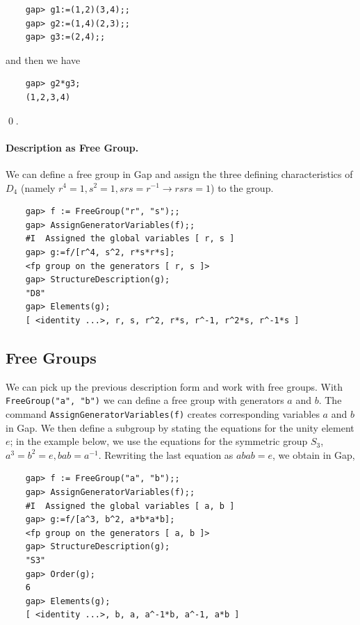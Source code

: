 \begin{verbatim}
    gap> g1:=(1,2)(3,4);;
    gap> g2:=(1,4)(2,3);;
    gap> g3:=(2,4);;
\end{verbatim}

and then we have

\begin{verbatim}
    gap> g2*g3;
    (1,2,3,4)
\end{verbatim}

\qed.

\paragraph{Description as Free Group.} We can define a free group in Gap and assign the three defining characteristics of $D_4$ (namely $r^4 = 1, s^2 = 1, srs = r^{-1} \rightarrow rsrs = 1$) to the group.

\begin{verbatim}
    gap> f := FreeGroup("r", "s");;
    gap> AssignGeneratorVariables(f);;
    #I  Assigned the global variables [ r, s ]
    gap> g:=f/[r^4, s^2, r*s*r*s];
    <fp group on the generators [ r, s ]>
    gap> StructureDescription(g);
    "D8"
    gap> Elements(g);
    [ <identity ...>, r, s, r^2, r*s, r^-1, r^2*s, r^-1*s ]
\end{verbatim}

\subsection{Free Groups}

We can pick up the previous description form and work with free groups. With \\ \verb+FreeGroup("a", "b")+ we can define a free group with generators $a$ and $b$. The command \verb+AssignGeneratorVariables(f)+ creates corresponding variables $a$ and $b$ in Gap. We then define a subgroup by stating the equations for the unity element $e$; in the example below, we use the equations for the symmetric group $S_3$, $a^3 = b^2 = e, bab = a^{-1}$. Rewriting the last equation as $abab=e$, we obtain in Gap,

\begin{verbatim}
    gap> f := FreeGroup("a", "b");;
    gap> AssignGeneratorVariables(f);;
    #I  Assigned the global variables [ a, b ]
    gap> g:=f/[a^3, b^2, a*b*a*b];
    <fp group on the generators [ a, b ]>
    gap> StructureDescription(g);
    "S3"
    gap> Order(g);
    6
    gap> Elements(g);
    [ <identity ...>, b, a, a^-1*b, a^-1, a*b ]
\end{verbatim}


